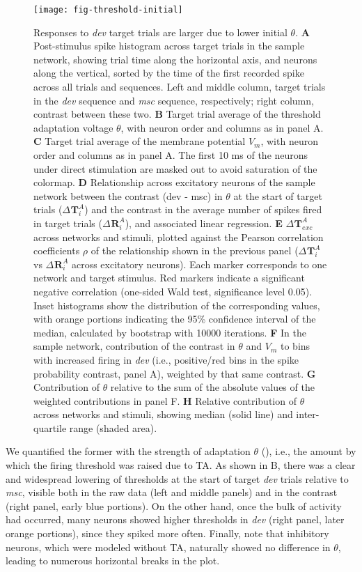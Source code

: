 \documentclass[9pt,lineno,onehalfspacing]{elife}
\newcommand{\dev}{\textit{dev}}
\newcommand{\msc}{\textit{msc}}
\newcommand{\R}[3][]{{}^{#1}_{}\boldsymbol R^{#2}_{#3}}
\newcommand{\T}[3][]{{}^{#1}_{}\boldsymbol T^{#2}_{#3}}
\begin{document}
\begin{figure}
    \texttt{[image: fig-threshold-initial]}
    \caption{%
        Responses to \dev{} target trials are larger due to lower initial $\theta$.
        \textbf{A} Post-stimulus spike histogram across target trials in the sample network, showing trial time along the horizontal axis, and neurons along the vertical, sorted by the time of the first recorded spike across all trials and sequences. Left and middle column, target trials in the \dev{} sequence and \msc{} sequence, respectively; right column, contrast between these two.
        \textbf{B} Target trial average of the threshold adaptation voltage $\theta$, with neuron order and columns as in panel A.
        \textbf{C} Target trial average of the membrane potential $V_m$, with neuron order and columns as in panel A. The first 10 ms of the neurons under direct stimulation are masked out to avoid saturation of the colormap.
        \textbf{D} Relationship across excitatory neurons of the sample network between the contrast (dev - msc) in $\theta$ at the start of target trials ($\Delta \T{A}{i}$) and the contrast in the average number of spikes fired in target trials ($\Delta \R{A}{i}$), and associated linear regression.
        \textbf{E} $\Delta \T{A}{exc}$ across networks and stimuli, plotted against the Pearson correlation coefficients $\rho$ of the relationship shown in the previous panel ($\Delta \T{A}{i}$ vs $\Delta \R{A}{i}$ across excitatory neurons). Each marker corresponds to one network and target stimulus. Red markers indicate a significant negative correlation (one-sided Wald test, significance level 0.05). Inset histograms show the distribution of the corresponding values, with orange portions indicating the 95\% confidence interval of the median, calculated by bootstrap with 10000 iterations.
        \textbf{F} In the sample network, contribution of the contrast in $\theta$ and $V_m$ to bins with increased firing in \dev{} (i.e., positive/red bins in the spike probability contrast, panel A), weighted by that same contrast.
        \textbf{G} Contribution of $\theta$ relative to the sum of the absolute values of the weighted contributions in panel F.
        \textbf{H} Relative contribution of $\theta$ across networks and stimuli, showing median (solid line) and inter-quartile range (shaded area).
    }
    \label{fig:threshold-initial}
\end{figure}

We quantified the former with the strength of adaptation $\theta$ (), i.e., the amount by which the firing threshold was raised due to TA. As shown in B, there was a clear and widespread lowering of thresholds at the start of target \dev{} trials relative to \msc{}, visible both in the raw data (left and middle panels) and in the contrast (right panel, early blue portions). On the other hand, once the bulk of activity had occurred, many neurons showed higher thresholds in \dev{} (right panel, later orange portions), since they spiked more often. Finally, note that inhibitory neurons, which were modeled without TA, naturally showed no difference in $\theta$, leading to numerous horizontal breaks in the plot.
\end{document}
